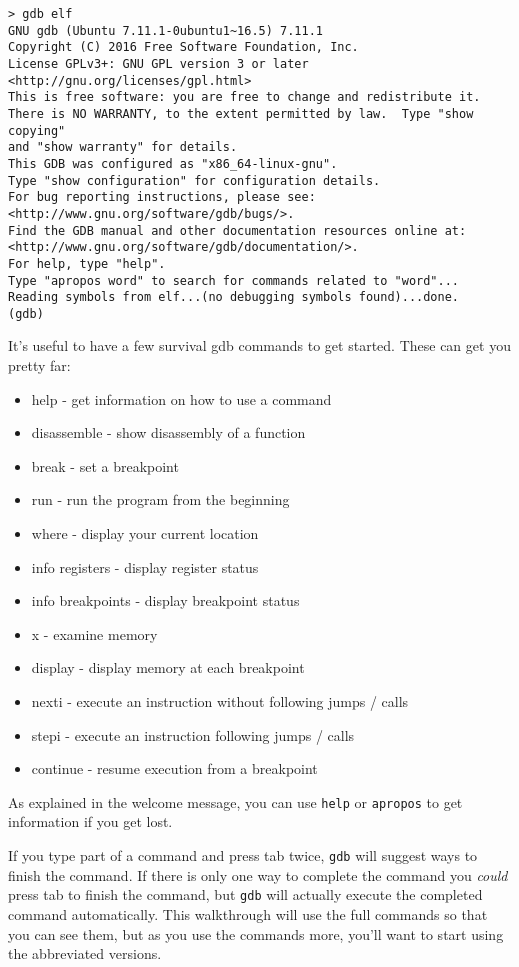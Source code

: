 \begin{lstlisting}
> gdb elf
GNU gdb (Ubuntu 7.11.1-0ubuntu1~16.5) 7.11.1
Copyright (C) 2016 Free Software Foundation, Inc.
License GPLv3+: GNU GPL version 3 or later <http://gnu.org/licenses/gpl.html>
This is free software: you are free to change and redistribute it.
There is NO WARRANTY, to the extent permitted by law.  Type "show copying"
and "show warranty" for details.
This GDB was configured as "x86_64-linux-gnu".
Type "show configuration" for configuration details.
For bug reporting instructions, please see:
<http://www.gnu.org/software/gdb/bugs/>.
Find the GDB manual and other documentation resources online at:
<http://www.gnu.org/software/gdb/documentation/>.
For help, type "help".
Type "apropos word" to search for commands related to "word"...
Reading symbols from elf...(no debugging symbols found)...done.
(gdb) 
\end{lstlisting}

It's useful to have a few survival gdb commands to get started. These can get
you pretty far:

\begin{itemize}
    \item help - get information on how to use a command
    \item disassemble - show disassembly of a function
    \item break - set a breakpoint
    \item run - run the program from the beginning
    \item where - display your current location
    \item info registers - display register status
    \item info breakpoints - display breakpoint status
    \item x - examine memory
    \item display - display memory at each breakpoint
    \item nexti - execute an instruction without following jumps / calls
    \item stepi - execute an instruction following jumps / calls
    \item continue - resume execution from a breakpoint
\end{itemize}

As explained in the welcome message, you can use \texttt{help} or
\texttt{apropos} to get information if you get lost.

If you type part of a command and press tab twice, \texttt{gdb} will suggest
ways to finish the command. If there is only one way to complete the command you
\emph{could} press tab to finish the command, but \texttt{gdb} will actually
execute the completed command automatically. This walkthrough will use the full
commands so that you can see them, but as you use the commands more, you'll want
to start using the abbreviated versions.

